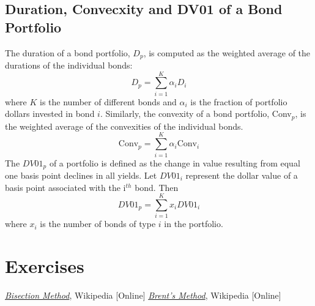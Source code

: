 \subsection{Duration, Convecxity and DV01 of a Bond Portfolio}
The duration of a bond portfolio, $D_p$, is computed as the weighted average of the durations of the individual
bonds:
\begin{equation}
D_p = \sum_{i=1}^{K} \alpha_i D_i
\end{equation}
where $K$ is the number of different bonds and $\alpha_i$ is the fraction of portfolio dollars invested in bond $i$. Similarly, the convexity of a bond portfolio, Conv$_p$, is the weighted average of the convexities of the individual bonds.
\begin{equation}
\textrm{Conv}_p = \sum^{K}_{i=1} \alpha_i \textrm{Conv}_i
\end{equation}
The $DV01_p$ of a portfolio is defined as the change in value resulting from equal one basis point declines in all yields. Let $DV01_i$ represent the dollar value of a basis point associated with the i$^{th}$ bond. Then
\begin{equation}
DV01_p = \sum^{K}_{i=1}x_i DV01_i
\end{equation}
where $x_i$ is the number of bonds of type $i$ in the portfolio.

\section*{Exercises}


\begin{thebibliography}{9}
	\href{https://en.wikipedia.org/wiki/Bisection_method}{\emph{Bisection Method}}, Wikipedia [Online]
	 \href{https://en.wikipedia.org/wiki/Brent%27s_method}{\emph{Brent's Method}}, Wikipedia [Online]
\end{thebibliography}
